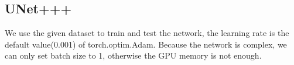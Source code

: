 \subsection{UNet+++}
We use the given dataset to train and test the network, the learning rate is the default value(0.001) of torch.optim.Adam.
Because the network is complex, we can only set batch size to 1, otherwise the GPU memory is not enough.